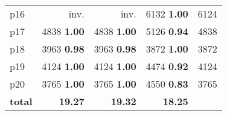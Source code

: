 \begin{tabular}{|l|rrr|r|}
p16 & inv. & inv. & {\footnotesize 6132} \textbf{1.00} & 6124\\
p17 & {\footnotesize 4838} \textbf{1.00} & {\footnotesize 4838} \textbf{1.00} & {\footnotesize 5126} \textbf{0.94} & 4838\\
p18 & {\footnotesize 3963} \textbf{0.98} & {\footnotesize 3963} \textbf{0.98} & {\footnotesize 3872} \textbf{1.00} & 3872\\
p19 & {\footnotesize 4124} \textbf{1.00} & {\footnotesize 4124} \textbf{1.00} & {\footnotesize 4474} \textbf{0.92} & 4124\\
p20 & {\footnotesize 3765} \textbf{1.00} & {\footnotesize 3765} \textbf{1.00} & {\footnotesize 4550} \textbf{0.83} & 3765\\
\hline
\textbf{total} & \textbf{19.27} & \textbf{19.32} & \textbf{18.25} & \\
\hline
\end{tabular}

